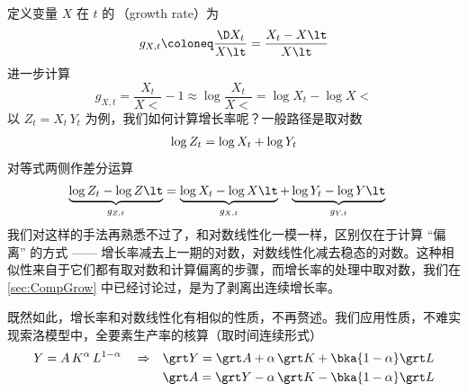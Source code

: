 定义变量 \(X\) 在 \(t\) 的\,（growth rate）为
\begin{equation}
    g_{X,t}\coloneq\dfrac{\D X_t}{X\lt}=\dfrac{X_t-X\lt}{X\lt}
\end{equation}
进一步计算
\begin{equation}
    g_{X,t}=\frac{X_t}{X\lt}-1\approx\log\frac{X_t}{X\lt}=\log X_t-\log X\lt\label{eq:GrowRateLog}
\end{equation}
以 \(Z_t=X_t\,Y_t\) 为例，我们如何计算增长率呢？一般路径是取对数
\begin{equation}
    \log Z_t=\log X_t+\log Y_t\notag
\end{equation}
对等式两侧作差分运算
\begin{align}
    \underbrace{\log Z_t-\log Z\lt}_{g_{Z,t}}&=\underbrace{\log X_t-\log X\lt}_{g_{X,t}}+\underbrace{\log Y_t-\log Y\lt}_{g_{Y,t}}\notag
\end{align}
我们对这样的手法再熟悉不过了，和对数线性化一模一样，区别仅在于计算 “偏离” 的方式 —— 增长率减去上一期的对数，对数线性化减去稳态的对数。这种相似性来自于它们都有取对数和计算偏离的步骤，而增长率的处理中取对数，我们在 \ref{sec:CompGrow} 中已经讨论过，是为了剥离出连续增长率。

既然如此，增长率和对数线性化有相似的性质，不再赘述。我们应用性质，不难实现索洛模型中，全要素生产率的核算（取时间连续形式）
\begin{align*}
    Y=A\,K^\alpha\,L^{1-\alpha} \quad \Rightarrow \quad  & \grt Y = \grt A + \alpha\,\grt K + \bka{1-\alpha}\grt L\notag\\
    & \grt A = \grt Y - \alpha\,\grt K - \bka{1-\alpha}\grt L
\end{align*}



\SymmetricGeometry

